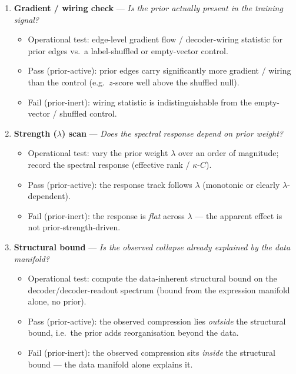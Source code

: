 \documentclass[11 pt,a4 paper]{article}
\begin{document}
\begin{enumerate}[leftmargin=1.4 em,label=\textbf{Check \arabic*.}]
\item \textbf{Gradient / wiring check} ---
 \emph{Is the prior actually present in the training signal?}
 \begin{itemize}[leftmargin=1.2 em]
 \item Operational test: edge-level gradient flow / decoder-wiring statistic
 for prior edges vs.\ a label-shuffled or empty-vector control.
 \item Pass (prior-active): prior edges carry significantly more gradient /
 wiring than the control (e.g.\ $z$-score well above the shuffled null).
 \item Fail (prior-inert): wiring statistic is indistinguishable from the
 empty-vector / shuffled control.
 \end{itemize}

\item \textbf{Strength ($\lambda$) scan} ---
 \emph{Does the spectral response depend on prior weight?}
 \begin{itemize}[leftmargin=1.2 em]
 \item Operational test: vary the prior weight $\lambda$ over an order of
 magnitude; record the spectral response (effective rank / $\kappa$-$C$).
 \item Pass (prior-active): the response track follows $\lambda$ (monotonic or
 clearly $\lambda$-dependent).
 \item Fail (prior-inert): the response is \emph{flat} across $\lambda$ ---
 the apparent effect is not prior-strength-driven.
 \end{itemize}

\item \textbf{Structural bound} ---
 \emph{Is the observed collapse already explained by the data manifold?}
 \begin{itemize}[leftmargin=1.2 em]
 \item Operational test: compute the data-inherent structural bound on the
 decoder/decoder-readout spectrum (bound from the expression manifold
 alone, no prior).
 \item Pass (prior-active): the observed compression lies \emph{outside} the
 structural bound, i.e.\ the prior adds reorganisation beyond the data.
 \item Fail (prior-inert): the observed compression sits \emph{inside} the
 structural bound --- the data manifold alone explains it.
 \end{itemize}


\end{enumerate}
\end{document}

